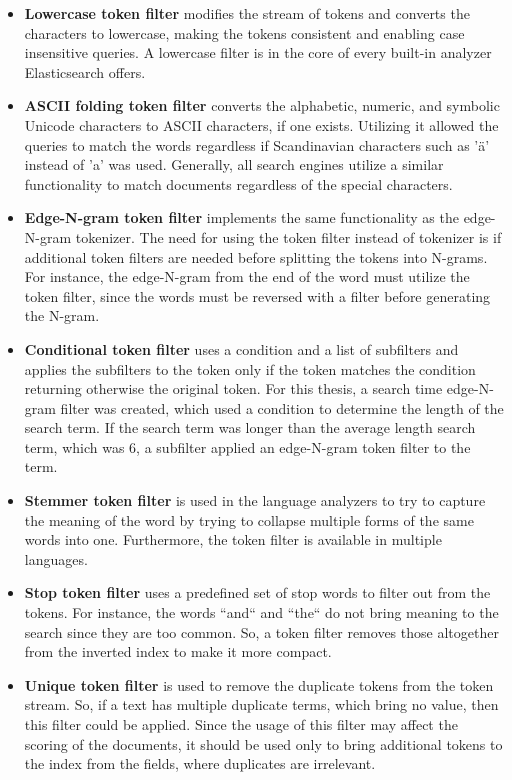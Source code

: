 \begin{itemize}
    \item \textbf{Lowercase token filter} modifies the stream of tokens and converts the characters to lowercase,
    making the tokens consistent and enabling case insensitive queries.
    A lowercase filter is in the core of every built-in analyzer Elasticsearch offers.
    
    \item \textbf{ASCII folding token filter} converts the alphabetic, numeric, and symbolic Unicode characters
    to ASCII characters, if one exists. 
    Utilizing it allowed the queries to match the words regardless if Scandinavian characters such as 'ä' instead of 'a' was used.
    Generally, all search engines utilize a similar functionality to match documents regardless
    of the special characters.
    
    \item \textbf{Edge-N-gram token filter} implements the same functionality as the edge-N-gram tokenizer.
    The need for using the token filter instead of tokenizer is if additional token filters are needed before splitting the tokens
    into N-grams.
    For instance, the edge-N-gram from the end of the word must utilize the token filter, since the 
    words must be reversed with a filter before generating the N-gram.
    
    \item \textbf{Conditional token filter} uses a condition and a list of subfilters and applies the 
    subfilters to the token only if the token matches the condition returning otherwise the original token.
    For this thesis, a search time edge-N-gram filter was created, which used a condition to determine 
    the length of the search term.
    If the search term was longer than the average length search term, which was 6, 
    a subfilter applied an edge-N-gram token filter to the term.
    
    \item \textbf{Stemmer token filter} is used in the language analyzers to try to capture the
    meaning of the word by trying to collapse multiple forms of the same words into one.
    Furthermore, the token filter is available in multiple languages.
    
    \item \textbf{Stop token filter} uses a predefined set of stop words to filter out from the tokens.
    For instance, the words ``and`` and ``the`` do not bring meaning to the search since they are too common.
    So, a token filter removes those altogether from the inverted index to make it more compact.
    
    \item \textbf{Unique token filter} is used to remove the duplicate tokens from the token stream. 
    So, if a text has multiple duplicate terms, which bring no value, then this filter could be applied.
    Since the usage of this filter may affect the scoring of the documents, 
    it should be used only to bring additional tokens to the index from the fields, 
    where duplicates are irrelevant.
    
\end{itemize}


